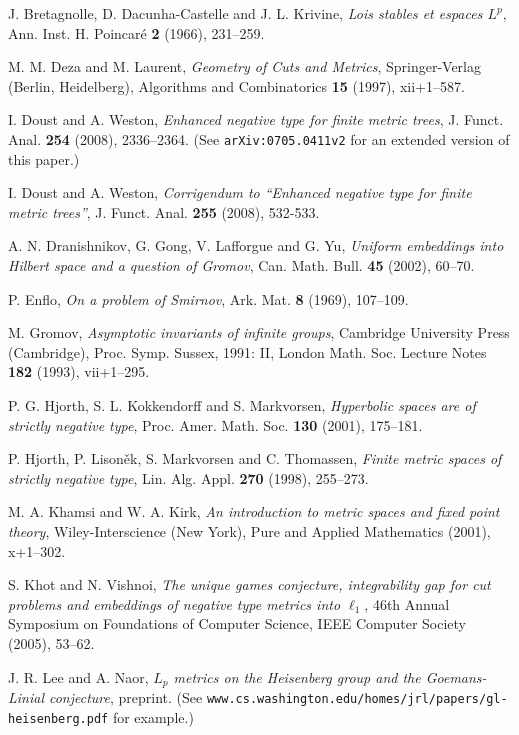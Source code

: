 \documentclass[10pt]{amsart}
\theoremstyle{definition}
\theoremstyle{remark}
\begin{document}
\begin{thebibliography}{BMWZ}
 J. Bretagnolle, D. Dacunha-Castelle and J. L. Krivine, \textit{Lois stables et espaces $L^{p}$},
Ann. Inst. H. Poincar\'{e} \textbf{2} (1966), 231--259.

 M. M. Deza and M. Laurent, \textsl{Geometry of Cuts and Metrics}, Springer-Verlag (Berlin, Heidelberg),
Algorithms and Combinatorics \textbf{15} (1997), xii+1--587.

 I. Doust and A. Weston, \textit{Enhanced negative type for finite metric trees}, J. Funct. Anal.
\textbf{254} (2008), 2336--2364. (See \texttt{arXiv:0705.0411v2} for an extended version of this paper.)

 I. Doust and A. Weston, \textit{Corrigendum to ``Enhanced negative type for finite metric
trees''}, J. Funct. Anal. \textbf{255} (2008), 532-533.

 A. N. Dranishnikov, G. Gong, V. Lafforgue and G. Yu, \textit{Uniform embeddings into Hilbert
space and a question of Gromov}, Can. Math. Bull. \textbf{45} (2002), 60--70.

 P. Enflo, \textit{On a problem of Smirnov}, Ark. Mat. \textbf{8} (1969), 107--109.

 M. Gromov, \textsl{Asymptotic invariants of infinite groups}, Cambridge University Press (Cambridge),
Proc. Symp. Sussex, 1991: II, London Math. Soc. Lecture Notes \textbf{182} (1993), vii+1--295.

 P. G. Hjorth, S. L. Kokkendorff and S. Markvorsen, \textit{Hyperbolic spaces are of
strictly negative type}, Proc. Amer. Math. Soc. \textbf{130} (2001), 175--181.

 P. Hjorth, P. Lison\v{e}k, S. Markvorsen and C. Thomassen, \textit{Finite metric spaces
of strictly negative type}, Lin. Alg. Appl. \textbf{270} (1998), 255--273.

 M. A. Khamsi and W. A. Kirk, \textsl{An introduction to metric spaces and fixed point theory},
Wiley-Interscience (New York), Pure and Applied Mathematics (2001), x+1--302.

 S. Khot and N. Vishnoi, \textit{The unique games conjecture, integrability gap for cut problems
and embeddings of negative type metrics into $\ell_{1}$}, 46th Annual Symposium on Foundations of Computer
Science, IEEE Computer Society (2005), 53--62.

 J. R. Lee and A. Naor, \textit{$L_{p}$ metrics on the Heisenberg group and the Goemans-Linial
conjecture}, preprint. (See \texttt{www.cs.washington.edu/homes/jrl/papers/gl-heisenberg.pdf} for example.)


\end{thebibliography}
\end{document}

